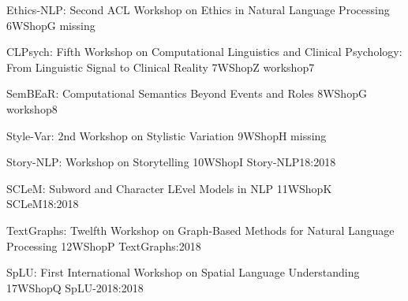  \begin{wsschedule}
   {Ethics-NLP: Second ACL Workshop on Ethics in Natural Language Processing}
   {6}{WShopG}
   {missing}
   {\WShopLocG}
   
 \end{wsschedule}


\begin{wsschedule}
  {CLPsych: Fifth Workshop on Computational Linguistics and Clinical Psychology: From Linguistic Signal to Clinical Reality}
  {7}{WShopZ}
  {workshop7}
  {\WShopLocZ}
  
\end{wsschedule}

\begin{wsschedule}
  {SemBEaR: Computational Semantics Beyond Events and Roles}
  {8}{WShopG}
  {workshop8}
  {\WShopLocG}
  
\end{wsschedule}

\begin{wsschedule}
  {Style-Var: 2nd Workshop on Stylistic Variation}
  {9}{WShopH}
  {missing}
  {\WShopLocH}
  
\end{wsschedule}

\begin{wsschedule}
  {Story-NLP: Workshop on Storytelling}
  {10}{WShopI}
  {Story-NLP18:2018}
  {\WShopLocI}
  
\end{wsschedule}



\begin{wsschedule}
  {SCLeM: Subword and Character LEvel Models in NLP}
  {11}{WShopK}
  {SCLeM18:2018}
  {\WShopLocK}
  
\end{wsschedule}

  \begin{wsschedule}
   {TextGraphs: Twelfth Workshop on Graph-Based Methods for Natural Language Processing}
   {12}{WShopP}
{TextGraphs:2018}
   {\WShopLocP}
   
 \end{wsschedule}


 \begin{wsschedule}
   {SpLU: First International Workshop on Spatial Language Understanding}
   {17}{WShopQ}
{SpLU-2018:2018}
   {\WShopLocO}
   
 \end{wsschedule}



\clearpage{\thispagestyle{emptyheader}\cleardoublepage}
